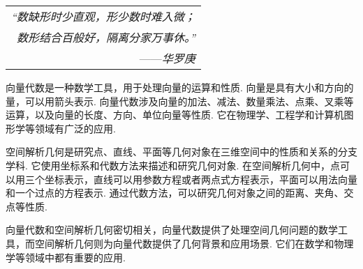 \begin{flushright}
    \begin{tabular}{r|}
        \textit{“数缺形时少直观，形少数时难入微；}\\
        \textit{数形结合百般好，隔离分家万事休。”}\\
        ——\textit{华罗庚}
    \end{tabular}
\end{flushright}

向量代数是一种数学工具，用于处理向量的运算和性质. 向量是具有大小和方向的量，可以用箭头表示. 向量代数涉及向量的加法、减法、数量乘法、点乘、叉乘等运算，以及向量的长度、方向、单位向量等性质. 它在物理学、工程学和计算机图形学等领域有广泛的应用. 

空间解析几何是研究点、直线、平面等几何对象在三维空间中的性质和关系的分支学科. 它使用坐标系和代数方法来描述和研究几何对象. 在空间解析几何中，点可以用三个坐标表示，直线可以用参数方程或者两点式方程表示，平面可以用法向量和一个过点的方程表示. 通过代数方法，可以研究几何对象之间的距离、夹角、交点等性质. 

向量代数和空间解析几何密切相关，向量代数提供了处理空间几何问题的数学工具，而空间解析几何则为向量代数提供了几何背景和应用场景. 它们在数学和物理学等领域中都有重要的应用. 
